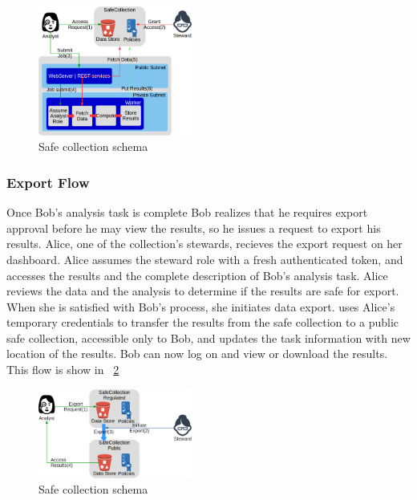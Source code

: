 \begin{figure}
  \center
  \includegraphics[width=0.45\textwidth]{figures/safe_flow.png}
  \caption{Safe collection schema}
  \label{fig:flow1}
  \vspace{-1.5em}
\end{figure}


\subsubsection{Export Flow}

Once Bob's analysis task is complete Bob realizes that he requires export approval before he may view the
results, so he issues a request to export his results. Alice, one of the collection's stewards, recieves
the export request on her dashboard. Alice assumes
the steward role with a fresh authenticated token, and accesses the results and the complete description
of Bob's analysis task. Alice reviews the data and the analysis to determine if the results are
safe for export. When she is satisfied with Bob's process, she initiates data export. \NAME
uses Alice's temporary credentials to transfer the results from the safe collection to a public
safe collection, accessible only to Bob, and updates the task information with new location of the results. Bob can now log on
and view or download the results. This flow is show in \figurename~\ref{fig:flow2}

\begin{figure}
  \center
  \includegraphics[width=0.45\textwidth]{figures/export_flow.png}
  \caption{Safe collection schema}
  \label{fig:flow2}
  \vspace{-1.5em}
\end{figure}



